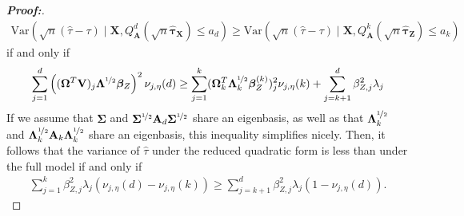 \documentclass[11pt,twoside]{article}
\theoremstyle{definition}
\theoremstyle{remark}
\begin{document}
\begin{proof}[\textbf{Proof:}]
    \begin{align*}
        \text{Var}(\sqrt{n}(\widehat{\tau} - \tau) \mid \mathbf{X}, Q^d_\mathbf{A}(\sqrt{n} \widehat{\bm{\tau}}_{\mathbf{X}}) \leq a_d) \geq \text{Var}(\sqrt{n}(\widehat{\tau} - \tau) \mid \mathbf{X}, Q^k_\mathbf{A}(\sqrt{n} \widehat{\bm{\tau}}_{\mathbf{Z}}) \leq a_k)
    \end{align*}
if and only if
    \begin{align*}
        \sum^d_{j=1} \left((\mathbf{\Omega}^T   \mathbf{V})_j \mathbf{\Lambda}^{\nicefrac{1}{2}}  \bm{\beta}_Z \right)^2 \nu_{j, \eta}(d)  \geq \sum^k_{j=1}(\mathbf{\Omega}^T_k \mathbf{\Lambda}^{\nicefrac{1}{2}}_k \bm{\beta}^{(k)}_Z)^2_j \nu_{j, \eta}(k) + \sum^d_{j = k+1} \beta^2_{Z,j} \lambda_j 
    \end{align*}
    If we assume that $\mathbf{\Sigma}$ and $\mathbf{\Sigma}^{\nicefrac{1}{2}} \mathbf{A}_d \mathbf{\Sigma}^{\nicefrac{1}{2}}$ share an eigenbasis, as well as that $\mathbf{\Lambda}^{\nicefrac{1}{2}}_k$ and $\mathbf{\Lambda}^{\nicefrac{1}{2}}_k \mathbf{A}_k \mathbf{\Lambda}^{\nicefrac{1}{2}}_k$ share an eigenbasis, this inequality simplifies nicely. Then, it follows that the variance of $\widehat{\tau}$ under the reduced quadratic form is less than under the full model if and only if
    \begin{align*}
        \sum^k_{j=1} \beta^2_{Z, j} \lambda_j (\nu_{j, \eta}(d) - \nu_{j, \eta}(k)) \geq \sum^d_{j=k+1} \beta^2_{Z, j} \lambda_j (1 - \nu_{j, \eta}(d)).
    \end{align*}
\end{proof}
\end{document}
